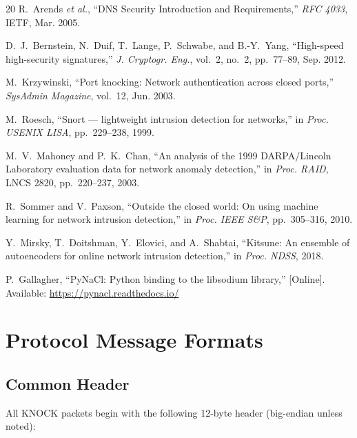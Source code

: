 \documentclass[10pt,conference]{IEEEtran}
\begin{document}
\begin{thebibliography}{20}
R.~Arends \textit{et al.},
``DNS Security Introduction and Requirements,''
\textit{RFC 4033}, IETF, Mar. 2005.

D.~J.~Bernstein, N.~Duif, T.~Lange, P.~Schwabe, and B.-Y.~Yang,
``High-speed high-security signatures,''
\textit{J. Cryptogr. Eng.}, vol.~2, no.~2, pp.~77--89, Sep. 2012.

M.~Krzywinski,
``Port knocking: Network authentication across closed ports,''
\textit{SysAdmin Magazine}, vol.~12, Jun. 2003.

M.~Roesch,
``Snort --- lightweight intrusion detection for networks,''
in \textit{Proc. USENIX LISA}, pp.~229--238, 1999.

M.~V.~Mahoney and P.~K.~Chan,
``An analysis of the 1999 DARPA/Lincoln Laboratory evaluation data for
network anomaly detection,''
in \textit{Proc. RAID}, LNCS 2820, pp.~220--237, 2003.

R.~Sommer and V.~Paxson,
``Outside the closed world: On using machine learning for network intrusion
detection,''
in \textit{Proc. IEEE S\&P}, pp.~305--316, 2010.

Y.~Mirsky, T.~Doitshman, Y.~Elovici, and A.~Shabtai,
``Kitsune: An ensemble of autoencoders for online network intrusion
detection,''
in \textit{Proc. NDSS}, 2018.

P.~Gallagher,
``PyNaCl: Python binding to the libsodium library,''
[Online]. Available: \url{https://pynacl.readthedocs.io/}

\end{thebibliography}

\appendix

\section{Protocol Message Formats}
\label{app:formats}

\subsection{Common Header}

All KNOCK packets begin with the following 12-byte header
(big-endian unless noted):
\end{document}
